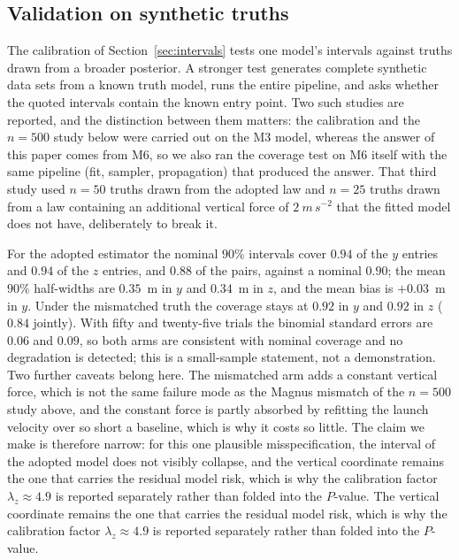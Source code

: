\subsection{Validation on synthetic truths}
\label{sec:validation}

The calibration of Section~\ref{sec:intervals} tests one model's intervals against
truths drawn from a broader posterior. A stronger test generates complete
synthetic data sets from a known truth model, runs the entire pipeline, and asks
whether the quoted intervals contain the known entry point. Two such studies are
reported, and the distinction between them matters: the calibration and the
$n=500$ study below were carried out on the M3 model, whereas the answer of this
paper comes from M6, so we also ran the coverage test on M6 itself with the same
pipeline (fit, sampler, propagation) that produced the answer. That third study
used $n=50$ truths drawn from the adopted law and $n=25$ truths drawn from a law
containing an additional vertical force of $\SI{2}{m\,s^{-2}}$ that the fitted
model does not have, deliberately to break it.

For the adopted estimator the nominal $90\%$ intervals cover $0.94$ of the $y$
entries and $0.94$ of the $z$ entries, and $0.88$ of the pairs, against a
nominal $0.90$; the mean $90\%$ half-widths are $0.35$~m in $y$ and $0.34$~m in
$z$, and the mean bias is $+0.03$~m in $y$. Under the mismatched truth the
coverage stays at $0.92$ in $y$ and $0.92$ in $z$ ($0.84$ jointly). With
fifty and twenty-five trials the binomial standard errors are $0.06$ and $0.09$,
so both arms are consistent with nominal coverage and no degradation is detected;
this is a small-sample statement, not a demonstration. Two further caveats
belong here. The mismatched arm adds a constant vertical force, which is not the
same failure mode as the Magnus mismatch of the $n=500$ study above, and the
constant force is partly absorbed by refitting the launch velocity over so short
a baseline, which is why it costs so little. The claim we make is therefore
narrow: for this one plausible misspecification, the interval of the adopted
model does not visibly collapse, and the vertical coordinate remains the one
that carries the residual model risk, which is why the calibration factor
$\lambda_z\approx4.9$ is reported separately rather than folded into the
$P$-value. The vertical
coordinate remains the one that carries the residual model risk, which is why the
calibration factor $\lambda_z\approx4.9$ is reported separately rather than
folded into the $P$-value.

